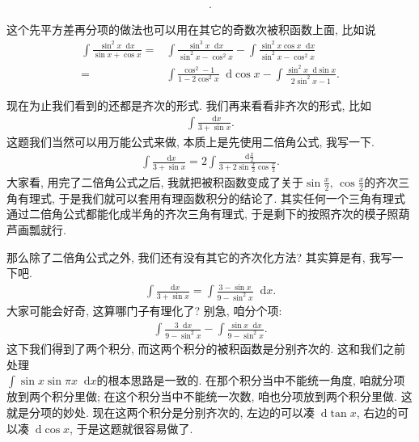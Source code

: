 \documentclass{ctexbook}
\newcommand*{\dif}{\mathop{}\!\mathrm{d}}
\begin{document}
{\begin{align*}
.\end{align*}\par
这个先平方差再分项的做法也可以用在其它的奇数次被积函数上面, 比如说
\begin{align*}
\int\frac{\sin^{2}{x}\dif{x}}{\sin{x}+\cos{x}}={}&\int\frac{\sin^{3}{x}\dif{x}}{\sin^{2}{x}-\cos^{2}{x}}-\int\frac{\sin^{2}{x}\cos{x}\dif{x}}{\sin^{2}{x}-\cos^{2}{x}}\\
={}&\int\frac{\cos^{2}-1}{1-2\cos^{2}{x}}\dif{\cos{x}}-\int\frac{\sin^{2}{x}\dif{\sin{x}}}{2\sin^{2}{x}-1}
.\end{align*}\par
现在为止我们看到的还都是齐次的形式. 我们再来看看非齐次的形式, 比如
\begin{align*}
\int\frac{\dif{x}}{3+\sin{x}}
.\end{align*}
这题我们当然可以用万能公式来做, 本质上是先使用二倍角公式, 我写一下. 
\begin{align*}
\int\frac{\dif{x}}{3+\sin{x}}=2\int\frac{\dif{\frac{x}{2}}}{3+2\sin{\frac{x}{2}}\cos{\frac{x}{2}}}
.\end{align*}
大家看, 用完了二倍角公式之后, 我就把被积函数变成了关于$\sin{\frac{x}{2}},\,\cos{\frac{x}{2}}$的齐次三角有理式, 于是我们就可以套用有理函数积分的结论了. 其实任何一个三角有理式通过二倍角公式都能化成半角的齐次三角有理式, 于是剩下的按照齐次的模子照葫芦画瓢就行. \par
那么除了二倍角公式之外, 我们还有没有其它的齐次化方法? 其实算是有, 我写一下吧. 
\begin{align*}
\int\frac{\dif{x}}{3+\sin{x}}=\int\frac{3-\sin{x}}{9-\sin^{2}{x}}\dif{x}
.\end{align*}
大家可能会好奇, 这算哪门子有理化了? 别急, 咱分个项: 
\begin{align*}
\int\frac{3\dif{x}}{9-\sin^{2}{x}}-\int\frac{\sin{x}\dif{x}}{9-\sin^{2}{x}}
.\end{align*}
这下我们得到了两个积分, 而这两个积分的被积函数是分别齐次的. 这和我们之前处理\\$\int\sin{x}\sin{\pi x}\dif{x}$的根本思路是一致的. 在那个积分当中不能统一角度, 咱就分项放到两个积分里做; 在这个积分当中不能统一次数, 咱也分项放到两个积分里做. 这就是分项的妙处. 现在这两个积分是分别齐次的, 左边的可以凑$\dif{\tan{x}}$, 右边的可以凑$\dif{\cos{x}}$, 于是这题就很容易做了. \par
}
\end{document}
